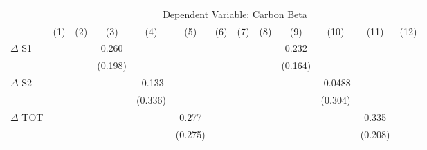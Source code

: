 {
\def\sym#1{\ifmmode^{#1}\else\(^{#1}\)\fi}
\begin{tabular}{l*{12}{c}}
\hline\hline
                    &\multicolumn{12}{c}{Dependent Variable: Carbon Beta}                                                                                                                                                                                                                   \\\cmidrule(lr){2-13}
                    &\multicolumn{1}{c}{(1)}         &\multicolumn{1}{c}{(2)}         &\multicolumn{1}{c}{(3)}         &\multicolumn{1}{c}{(4)}         &\multicolumn{1}{c}{(5)}         &\multicolumn{1}{c}{(6)}         &\multicolumn{1}{c}{(7)}         &\multicolumn{1}{c}{(8)}         &\multicolumn{1}{c}{(9)}         &\multicolumn{1}{c}{(10)}         &\multicolumn{1}{c}{(11)}         &\multicolumn{1}{c}{(12)}         \\
\hline
$\Delta$ S1         &                     &                     &       0.260         &                     &                     &                     &                     &                     &       0.232         &                     &                     &                     \\
                    &                     &                     &     (0.198)         &                     &                     &                     &                     &                     &     (0.164)         &                     &                     &                     \\
$\Delta$ S2         &                     &                     &                     &      -0.133         &                     &                     &                     &                     &                     &     -0.0488         &                     &                     \\
                    &                     &                     &                     &     (0.336)         &                     &                     &                     &                     &                     &     (0.304)         &                     &                     \\
$\Delta$ TOT        &                     &                     &                     &                     &       0.277         &                     &                     &                     &                     &                     &       0.335         &                     \\
                    &                     &                     &                     &                     &     (0.275)         &                     &                     &                     &                     &                     &     (0.208)         &                     \\

\end{tabular}}
